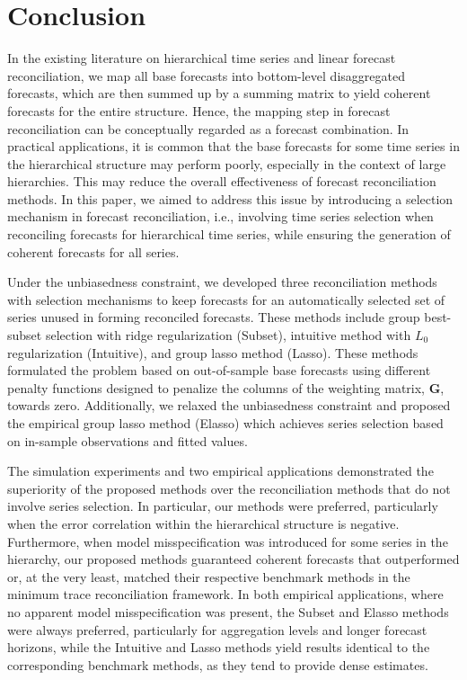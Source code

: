 \documentclass[11pt,a4paper,]{article}
\begin{document}
\hypertarget{sec-conclusion}{%
\section{Conclusion}\label{sec-conclusion}}

In the existing literature on hierarchical time series and linear
forecast reconciliation, we map all base forecasts into bottom-level
disaggregated forecasts, which are then summed up by a summing matrix to
yield coherent forecasts for the entire structure. Hence, the mapping
step in forecast reconciliation can be conceptually regarded as a
forecast combination. In practical applications, it is common that the
base forecasts for some time series in the hierarchical structure may
perform poorly, especially in the context of large hierarchies. This may
reduce the overall effectiveness of forecast reconciliation methods. In
this paper, we aimed to address this issue by introducing a selection
mechanism in forecast reconciliation, i.e., involving time series
selection when reconciling forecasts for hierarchical time series, while
ensuring the generation of coherent forecasts for all series.

Under the unbiasedness constraint, we developed three reconciliation
methods with selection mechanisms to keep forecasts for an automatically
selected set of series unused in forming reconciled forecasts. These
methods include group best-subset selection with ridge regularization
(Subset), intuitive method with \(L_0\) regularization (Intuitive), and
group lasso method (Lasso). These methods formulated the problem based
on out-of-sample base forecasts using different penalty functions
designed to penalize the columns of the weighting matrix,
\(\boldsymbol{G}\), towards zero. Additionally, we relaxed the
unbiasedness constraint and proposed the empirical group lasso method
(Elasso) which achieves series selection based on in-sample observations
and fitted values.

The simulation experiments and two empirical applications demonstrated
the superiority of the proposed methods over the reconciliation methods
that do not involve series selection. In particular, our methods were
preferred, particularly when the error correlation within the
hierarchical structure is negative. Furthermore, when model
misspecification was introduced for some series in the hierarchy, our
proposed methods guaranteed coherent forecasts that outperformed or, at
the very least, matched their respective benchmark methods in the
minimum trace reconciliation framework. In both empirical applications,
where no apparent model misspecification was present, the Subset and
Elasso methods were always preferred, particularly for aggregation
levels and longer forecast horizons, while the Intuitive and Lasso
methods yield results identical to the corresponding benchmark methods,
as they tend to provide dense estimates.
\end{document}
